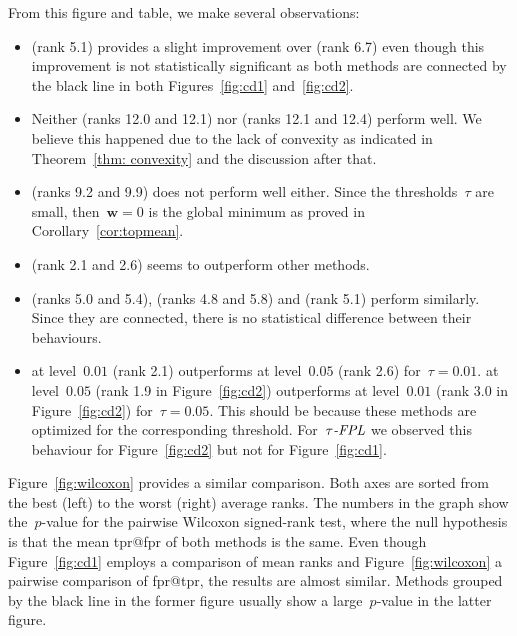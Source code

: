 From this figure and table, we make several observations:
\begin{itemize}
  \item \TopPushK (rank 5.1) provides a slight improvement over \TopPush (rank 6.7) even though this improvement is not statistically significant as both methods are connected by the black line in both Figures~\ref{fig:cd1} and~\ref{fig:cd2}.
  \item Neither \Grill (ranks 12.0 and 12.1) nor \GrillNP (ranks 12.1 and 12.4) perform well. We believe this happened due to the lack of convexity as indicated in Theorem~\ref{thm: convexity} and the discussion after that.
  \item \TopMeanK (ranks 9.2 and 9.9) does not perform well either. Since the thresholds~$\tau$ are small, then~$\bm{w}=0$ is the global minimum as proved in Corollary~\ref{cor:topmean}.
  \item \PatMatNP (rank 2.1 and 2.6) seems to outperform other methods.
  \item \PatMat (ranks 5.0 and 5.4), \tauFPL (ranks 4.8 and 5.8) and \TopPushK (rank 5.1) perform similarly. Since they are connected, there is no statistical difference between their behaviours.
  \item \PatMatNP at level~$0.01$ (rank 2.1) outperforms \PatMatNP at level~$0.05$ (rank 2.6) for~$\tau=0.01$. \PatMatNP at level~$0.05$ (rank 1.9 in Figure~\ref{fig:cd2}) outperforms \PatMatNP at level~$0.01$ (rank 3.0 in Figure~\ref{fig:cd2}) for~$\tau=0.05$. This should be because these methods are optimized for the corresponding threshold. For~${\emph{$\tau$-FPL}}$ we observed this behaviour for Figure~\ref{fig:cd2} but not for Figure~\ref{fig:cd1}.
\end{itemize}

Figure~\ref{fig:wilcoxon} provides a similar comparison. Both axes are sorted from the best (left) to the worst (right) average ranks. The numbers in the graph show the~$p$-value for the pairwise Wilcoxon signed-rank test, where the null hypothesis is that the mean tpr@fpr of both methods is the same. Even though Figure~\ref{fig:cd1} employs a comparison of mean ranks and Figure~\ref{fig:wilcoxon} a pairwise comparison of fpr@tpr, the results are almost similar. Methods grouped by the black line in the former figure usually show a large~$p$-value in the latter figure.

